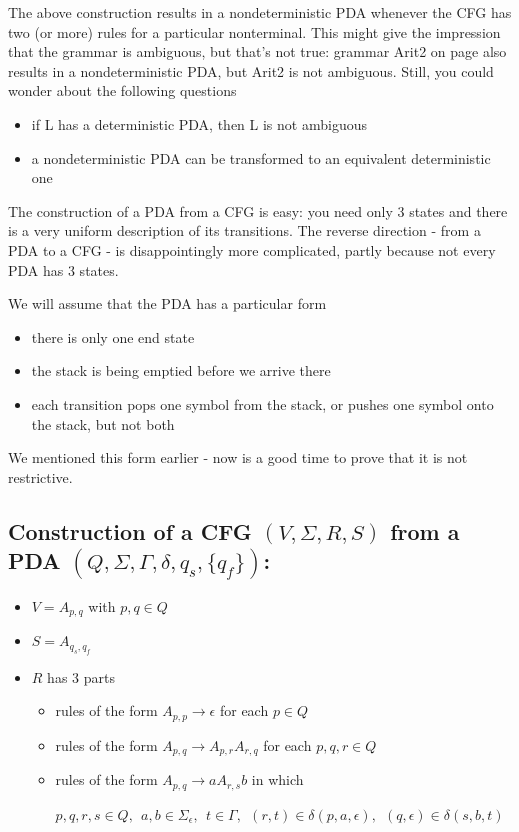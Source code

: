 The above construction results in a nondeterministic PDA whenever the
CFG has two (or more) rules for a particular nonterminal. This might
give the impression that the grammar is ambiguous, but that's not true: grammar
Arit2 on page \pageref{arit2label} also results in a nondeterministic
PDA, but Arit2 is not ambiguous. Still, you could wonder about the
following questions
\begin{itemize}
\item
if L has a deterministic PDA, then L is not ambiguous
\item
a nondeterministic PDA can be transformed to an equivalent
deterministic one
\end{itemize}


The construction of a PDA from a CFG is easy: you need only 3
states and there is a very uniform description of its transitions.
The reverse direction - from a PDA to a CFG - is disappointingly more
complicated, partly because not every PDA has 3 states. 


We will assume that the PDA has a particular form
\begin{itemize}
\item there is only one end state
\item the stack is being emptied before we arrive there
\item each transition pops one symbol from the stack, or pushes one
  symbol onto the stack, but not both
\end{itemize}
We mentioned this form earlier - now is a good time to prove that it
is not restrictive.


\subsection{Construction of a CFG $(V,\Sigma,R,S)$ from a PDA
$(Q,\Sigma,\Gamma,\delta,q_s,\{q_f\})$:}
\begin{itemize}
\item $V = A_{p,q}$ with $p, q \in Q$
\item $S = A_{q_s,q_f}$
\item $R$ has 3 parts
\begin{itemize}
\item rules of the form $A_{p,p} \rightarrow \epsilon$ for each $p \in Q$
\item rules of the form $A_{p,q} \rightarrow A_{p,r}A_{r,q}$ for each
  $p, q, r \in Q$
\item rules of the form $A_{p,q} \rightarrow aA_{r,s}b$ in which

$p, q, r, s \in Q, ~~
a,b \in \Sigma_\epsilon, ~~
t \in \Gamma,~~
(r,t) \in \delta(p,a,\epsilon),~~
(q,\epsilon) \in \delta(s,b,t)$
\end{itemize}

\end{itemize}

